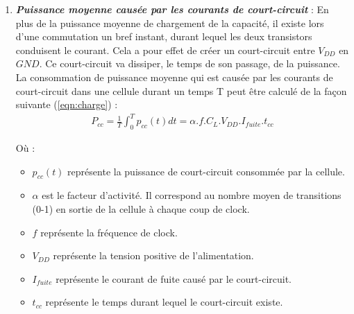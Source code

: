 \documentclass[10pt, oneside, a4paper]{article}
\begin{document}
\begin{enumerate}
\vspace{-0.2 cm}\item \textbf{\textit{Puissance moyenne causée par les courants de court-circuit}} : En plus de la puissance moyenne de chargement de la capacité, il existe lors d'une commutation un bref instant, durant lequel les deux transistors conduisent le courant. Cela a pour effet de créer un court-circuit entre $V_{DD}$ en $GND$. Ce court-circuit va dissiper, le temps de son passage, de la puissance. La consommation de puissance moyenne qui est causée par les courants de court-circuit dans une cellule durant un temps T peut être calculé de la façon suivante (\ref{eqn:charge}) :
\begin{gather}
	P_{cc} = \frac{1}{T}\int_{0}^{T}p_{cc}(t)dt=\alpha.f.C_{L}.V_{DD}.I_{fuite}.t_{cc}
\end{gather}

Où : 
\begin{itemize}
\item $p_{cc}(t)$ représente la puissance de court-circuit consommée par la cellule.
\item $\alpha$ est le facteur d'activité. Il correspond au nombre moyen de transitions (0-1) en sortie de la cellule à chaque coup de clock.
\item $f$ représente la fréquence de clock.
\item $V_{DD}$ représente la tension positive de l'alimentation.
\item $I_{fuite}$ représente le courant de fuite causé par le court-circuit.
\item $t_{cc}$ représente le temps durant lequel le court-circuit existe.
\end{itemize}

\end{enumerate}
\end{document}
